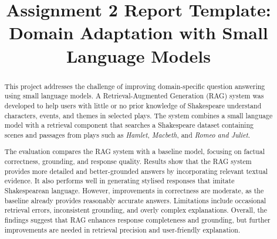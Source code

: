 \documentclass[10pt,conference]{IEEEtran}
\title{
Assignment 2 Report Template:\\
Domain Adaptation with Small Language Models
}
\author{
\IEEEauthorblockN{
Group Number: \emph{Insert Group Number}
}
\IEEEauthorblockA{
CSCI433/933 Machine Learning Algorithms and Applications\\
Student Names and Student Numbers: \emph{Insert Details}\\
}
}
\begin{document}
\maketitle


\begin{abstract}
This project addresses the challenge of improving domain-specific question answering using small language models. A Retrieval-Augmented Generation (RAG) system was developed to help users with little or no prior knowledge of Shakespeare understand characters, events, and themes in selected plays. The system combines a small language model with a retrieval component that searches a Shakespeare dataset containing scenes and passages from plays such as \textit{Hamlet}, \textit{Macbeth}, and \textit{Romeo and Juliet}. 

The evaluation compares the RAG system with a baseline model, focusing on factual correctness, grounding, and response quality. Results show that the RAG system provides more detailed and better-grounded answers by incorporating relevant textual evidence. It also performs well in generating stylised responses that imitate Shakespearean language. However, improvements in correctness are moderate, as the baseline already provides reasonably accurate answers. Limitations include occasional retrieval errors, inconsistent grounding, and overly complex explanations. Overall, the findings suggest that RAG enhances response completeness and grounding, but further improvements are needed in retrieval precision and user-friendly explanation.
\end{abstract}
\end{document}
